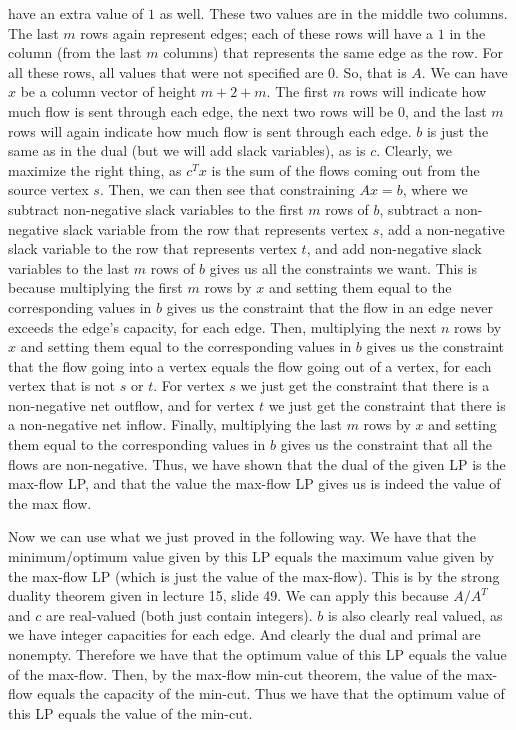 \documentclass{article}
\begin{document}
\begin{description}
        have an extra value of $1$ as well. These two values are in the middle two
        columns. The last $m$ rows again
        represent edges; each of these rows will have a $1$ in the column (from
        the last $m$ columns) that represents the same edge as the row. For all
        these rows, all values that were not specified are $0$. So, that
        is $A$. We can have $x$ be a column vector of height $m + 2 + m$. The
        first $m$ rows will indicate how much flow is sent through each edge,
        the next two rows will be $0$, and the last $m$ rows will again indicate
        how much flow is sent through each edge. $b$ is just the same as in the
        dual (but we will add slack variables), as is $c$. Clearly, we maximize
        the right thing, as $c^T x$ is the sum of the flows coming out from the
        source vertex $s$. Then,
        we can then see that constraining $Ax = b$, where we subtract
        non-negative slack variables to the first $m$ rows of $b$, subtract a
        non-negative slack variable from the row that represents vertex $s$, add
        a non-negative slack variable to the row that represents vertex $t$,
        and add non-negative slack
        variables to the last $m$ rows of $b$ gives us all the constraints we
        want. This is because multiplying the first $m$ rows by $x$ and setting
        them equal to the corresponding values in $b$ gives us the
        constraint that the flow in an edge never exceeds the edge's capacity,
        for each edge. Then, multiplying the next $n$ rows by $x$ and setting
        them equal to the corresponding values in $b$ gives us the
        constraint that the flow going into a vertex equals the flow going out of
        a vertex, for each vertex that is not $s$ or $t$. For vertex $s$ we just
        get the constraint that there is a non-negative net outflow,
        and for vertex $t$ we just get the constraint that there is a
        non-negative net inflow. Finally, multiplying the last $m$ rows by $x$
        and setting them equal to the corresponding values in $b$ gives us the
        constraint that all the flows are non-negative. Thus, we have shown that the
        dual of the given LP is the max-flow LP, and that the value the max-flow
        LP gives us is indeed the value of the max flow.

        Now we can use what we just proved in the following way. We have that
        the minimum/optimum value given by this LP equals the maximum value
        given by the max-flow LP (which is just the value of the max-flow).
        This is by the strong duality theorem given in lecture 15, slide 49. We can apply
        this because $A/A^T$ and $c$ are real-valued (both just contain integers).
        $b$ is also clearly real valued, as we have integer
        capacities for each edge. And clearly the dual and primal are nonempty.
        Therefore we have that the optimum value of this LP equals the value of the max-flow.
        Then, by the max-flow min-cut theorem, the value of the max-flow equals the
        capacity of the min-cut. Thus we have that the optimum value of this LP equals
        the value of the min-cut.
\end{description}
\newpage

\end{document}
